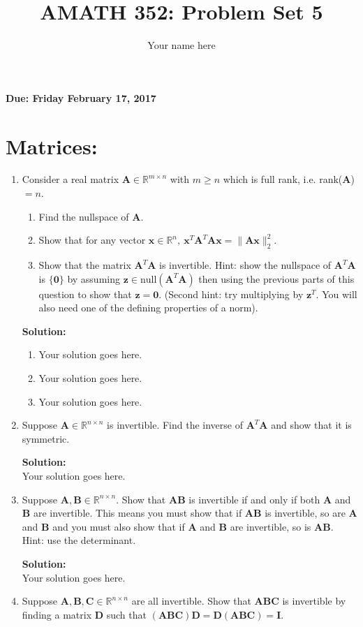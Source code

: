 \documentclass[]{article}
\title{AMATH 352: Problem Set 5}
\author{Your name here}
\newcommand{\R}{\mathbb{R}}				%
\newcommand{\x}{\bm{x}}					%
\newcommand{\A}{\bm{A}}					%
\newcommand{\solution}{\vskip 0.5cm \textbf{\large Solution:} \\}
\begin{document}
\maketitle
{\Large \textbf{Due: Friday February 17, 2017}} \\


\section*{Matrices:}
\begin{enumerate}
	\item Consider a real matrix $\A\in\R^{m\times n}$ with $m\geq n$ which is full rank, i.e. rank($\A$)$=n$.
	\begin{enumerate}
		\item Find the nullspace of $\A$.
		\item Show that for any vector $\x\in\R^n,~\x^T\A^T\A\x=\|\A\x\|^2_2$.
		\item Show that the matrix $\A^T\A$ is invertible. Hint: show the nullspace of $\A^T\A$ is $\{\bm{0}\}$ by assuming $\bm{z}\in\mathrm{null}(\A^T\A)$ then using the previous parts of this question to show that $\bm{z}=\bm{0}$. (Second hint: try multiplying by $\bm{z}^T$. You will also need one of the defining properties of a norm).
	\end{enumerate}

	\solution
	\begin{enumerate}
		\item Your solution goes here.
		\item Your solution goes here.
		\item Your solution goes here.
	\end{enumerate}
	
	\item Suppose $\A\in\R^{n\times n}$ is invertible. Find the inverse of $\A^T\A$ and show that it is symmetric.

	\solution
	Your solution goes here.


	\item Suppose $\A,\bm{B}\in\R^{n\times n}$. Show that $\bm{AB}$ is invertible if and only if both $\A$ and $\bm{B}$ are invertible. This means you must show that if $\bm{AB}$ is invertible, so are $\A$ and $\bm{B}$ and you must also show that if $\A$ and $\bm{B}$ are invertible, so is $\bm{AB}$. Hint: use the determinant.

	\solution
	Your solution goes here.


	\item Suppose $\A,\bm{B},\bm{C}\in\R^{n\times n}$ are all invertible. Show that $\bm{ABC}$ is invertible by finding a matrix $\bm{D}$ such that $(\bm{ABC})\bm{D}=\bm{D}(\bm{ABC})=\bm{I}$.


\end{enumerate}
\end{document}
